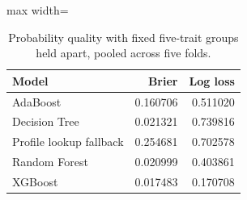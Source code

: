 \begin{table}[H]
\centering\small
\caption{Probability quality with fixed five-trait groups held apart, pooled across five folds.}
\begin{adjustbox}{max width=\linewidth}\begin{tabular}{lrr}
\toprule
Model & Brier & Log loss \\
\midrule
AdaBoost & 0.160706 & 0.511020 \\
Decision Tree & 0.021321 & 0.739816 \\
Profile lookup fallback & 0.254681 & 0.702578 \\
Random Forest & 0.020999 & 0.403861 \\
XGBoost & 0.017483 & 0.170708 \\
\bottomrule
\end{tabular}\end{adjustbox}
\end{table}

